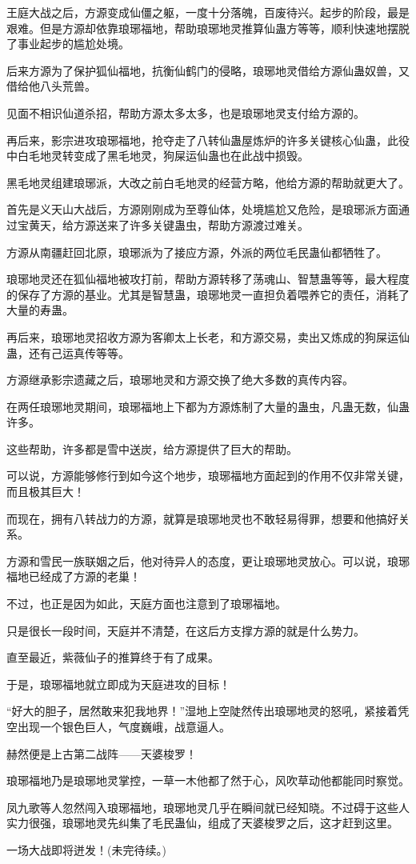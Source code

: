 \begin{this_body}
王庭大战之后，方源变成仙僵之躯，一度十分落魄，百废待兴。起步的阶段，最是艰难。但是方源却依靠琅琊福地，帮助琅琊地灵推算仙蛊方等等，顺利快速地摆脱了事业起步的尴尬处境。

后来方源为了保护狐仙福地，抗衡仙鹤门的侵略，琅琊地灵借给方源仙蛊奴兽，又借给他八头荒兽。

见面不相识仙道杀招，帮助方源太多太多，也是琅琊地灵支付给方源的。

再后来，影宗进攻琅琊福地，抢夺走了八转仙蛊屋炼炉的许多关键核心仙蛊，此役中白毛地灵转变成了黑毛地灵，狗屎运仙蛊也在此战中损毁。

黑毛地灵组建琅琊派，大改之前白毛地灵的经营方略，他给方源的帮助就更大了。

首先是义天山大战后，方源刚刚成为至尊仙体，处境尴尬又危险，是琅琊派方面通过宝黄天，给方源送来了许多关键蛊虫，帮助方源渡过难关。

方源从南疆赶回北原，琅琊派为了接应方源，外派的两位毛民蛊仙都牺牲了。

琅琊地灵还在狐仙福地被攻打前，帮助方源转移了荡魂山、智慧蛊等等，最大程度的保存了方源的基业。尤其是智慧蛊，琅琊地灵一直担负着喂养它的责任，消耗了大量的寿蛊。

再后来，琅琊地灵招收方源为客卿太上长老，和方源交易，卖出又炼成的狗屎运仙蛊，还有己运真传等等。

方源继承影宗遗藏之后，琅琊地灵和方源交换了绝大多数的真传内容。

在两任琅琊地灵期间，琅琊福地上下都为方源炼制了大量的蛊虫，凡蛊无数，仙蛊许多。

这些帮助，许多都是雪中送炭，给方源提供了巨大的帮助。

可以说，方源能够修行到如今这个地步，琅琊福地方面起到的作用不仅非常关键，而且极其巨大！

而现在，拥有八转战力的方源，就算是琅琊地灵也不敢轻易得罪，想要和他搞好关系。

方源和雪民一族联姻之后，他对待异人的态度，更让琅琊地灵放心。可以说，琅琊福地已经成了方源的老巢！

不过，也正是因为如此，天庭方面也注意到了琅琊福地。

只是很长一段时间，天庭并不清楚，在这后方支撑方源的就是什么势力。

直至最近，紫薇仙子的推算终于有了成果。

于是，琅琊福地就立即成为天庭进攻的目标！

“好大的胆子，居然敢来犯我地界！”湿地上空陡然传出琅琊地灵的怒吼，紧接着凭空出现一个银色巨人，气度巍峨，战意逼人。

赫然便是上古第二战阵——天婆梭罗！

琅琊福地乃是琅琊地灵掌控，一草一木他都了然于心，风吹草动他都能同时察觉。

凤九歌等人忽然闯入琅琊福地，琅琊地灵几乎在瞬间就已经知晓。不过碍于这些人实力很强，琅琊地灵先纠集了毛民蛊仙，组成了天婆梭罗之后，这才赶到这里。

一场大战即将迸发！(未完待续。)

\end{this_body}


